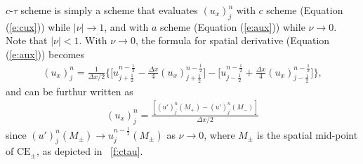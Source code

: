 \documentclass[letterpaper,12pt,dvips]{article}
\numberwithin{equation}{section}
\begin{document}
$c$-$\tau$ scheme is simply a scheme that evaluates $(u_x)_j^n$ with 
$c$ scheme (Equation (\ref{e:cux})) while $|\nu|\rightarrow1$, and with 
$a$ scheme (Equation (\ref{e:aux})) while $\nu\rightarrow0$.
Note that $|\nu|<1$.
With $\nu\rightarrow0$, the formula for spatial derivative 
(Equation (\ref{e:aux})) becomes
\begin{align*}
  (u_x)_j^n = \frac{1}{\Delta x/2}\Big\{
      \Big[ u_{j+\frac{1}{2}}^{n-\frac{1}{2}}
         - \frac{\Delta x}{4}(u_x)_{j+\frac{1}{2}}^{n-\frac{1}{2}} 
      \Big]
    - \Big[ u_{j-\frac{1}{2}}^{n-\frac{1}{2}}
         + \frac{\Delta x}{4}(u_x)_{j-\frac{1}{2}}^{n-\frac{1}{2}} 
      \Big]
  \Big\}, 
\end{align*}
and can be furthur written as
\begin{align*}
  (u_x)_j^n = 
    \frac{\left[(u')_j^n(M_+) - (u')_j^n(M_-)\right]}{\Delta x/2}
\end{align*}
since $(u')_j^n(M_{\pm}) \rightarrow u_j^{n-\frac{1}{2}}(M_{\pm})$ as 
$\nu\rightarrow0$, where $M_{\pm}$ is the spatial mid-point of 
$\mathrm{CE}_{\pm}$, as depicted in \figurename~\ref{f:ctau}.
\end{document}

